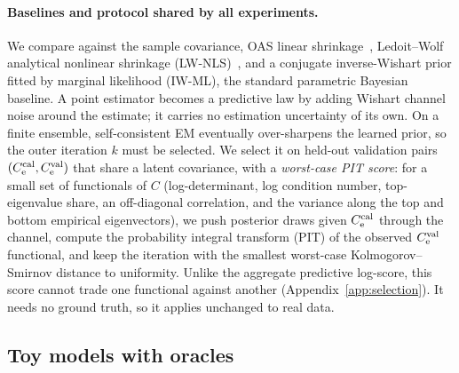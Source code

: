 \paragraph{Baselines and protocol shared by all experiments.}
We compare against the sample covariance, OAS linear shrinkage~\citep{chen2010shrinkage}, Ledoit--Wolf analytical nonlinear shrinkage (LW-NLS)~\citep{ledoit2020analytical}, and a conjugate inverse-Wishart prior fitted by marginal likelihood (IW-ML), the standard parametric Bayesian baseline.
A point estimator becomes a predictive law by adding Wishart channel noise around the estimate; it carries no estimation uncertainty of its own.
On a finite ensemble, self-consistent EM eventually over-sharpens the learned prior, so the outer iteration $k$ must be selected.
We select it on held-out validation pairs $(C_{\mathrm{e}}^{\mathrm{cal}},C_{\mathrm{e}}^{\mathrm{val}})$ that share a latent covariance, with a \emph{worst-case PIT score}: for a small set of functionals of $C$ (log-determinant, log condition number, top-eigenvalue share, an off-diagonal correlation, and the variance along the top and bottom empirical eigenvectors), we push posterior draws given $C_{\mathrm{e}}^{\mathrm{cal}}$ through the channel, compute the probability integral transform (PIT) of the observed $C_{\mathrm{e}}^{\mathrm{val}}$ functional, and keep the iteration with the smallest worst-case Kolmogorov--Smirnov distance to uniformity.
Unlike the aggregate predictive log-score, this score cannot trade one functional against another (Appendix~\ref{app:selection}).
It needs no ground truth, so it applies unchanged to real data.

\subsection{Toy models with oracles}
\label{sec:exp-toys}

